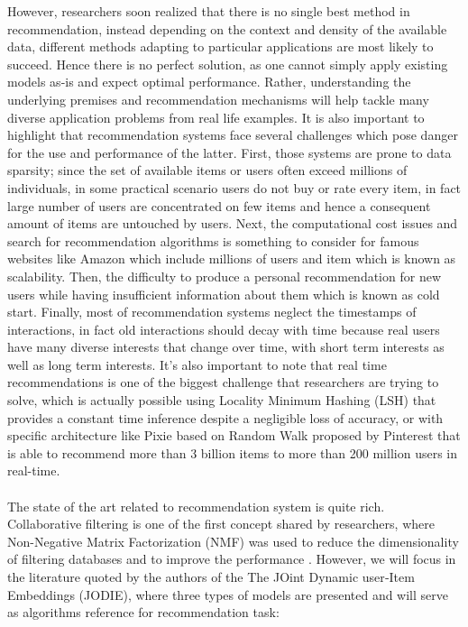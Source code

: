 {However, researchers soon realized that there is no single best method in recommendation, instead depending on the context and density of the available data, different methods adapting to particular applications are most likely to succeed. Hence there is no perfect solution, as one cannot simply apply existing models as-is and expect optimal performance. Rather, understanding the underlying premises and recommendation mechanisms will help tackle many diverse application problems from real life examples. It is also important to highlight that recommendation systems face several challenges which pose danger for the use and performance of the latter. First, those systems are prone to data sparsity; since the set of available items or users often exceed millions of individuals, in some practical scenario users do not buy or rate every item, in fact large number of users are concentrated on few items and hence a consequent amount of items are untouched by users. Next, the computational cost issues and search for recommendation algorithms is something to consider for famous websites like Amazon which include millions of users and item which is known as scalability. Then, the difficulty to produce a personal recommendation for new users while having insufficient information about them which is known as cold start. Finally, most of recommendation systems neglect the timestamps of interactions, in fact  old interactions should decay with time because real users have many diverse interests that change over time, with short term interests as well as long term interests. It's also important to note that real time recommendations is one of the biggest challenge  that researchers  are trying to solve, which is actually possible using Locality Minimum Hashing (LSH) \supercite{lsh} that provides a constant time inference despite a negligible loss of accuracy, or with specific architecture like Pixie \supercite{pixie} based on Random Walk proposed by Pinterest that is able to recommend more than 3 billion items to more than 200 million users in real-time.\\ \\
The state of the art related to recommendation system is quite rich. Collaborative filtering is one of the first concept shared by researchers, where Non-Negative Matrix Factorization (NMF) was used to reduce the dimensionality of filtering databases and to improve the performance \supercite{1714249}. However, we will focus in the literature quoted by the authors of the The JOint Dynamic user‐Item Embeddings (JODIE), where three types of models are presented and will serve as algorithms reference for recommendation task:
}
